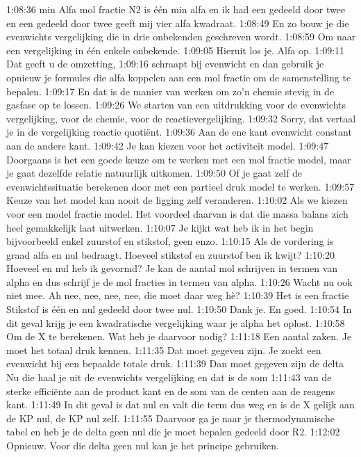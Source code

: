 1:08:36
min Alfa mol fractie N2 is één min alfa en ik had een gedeeld door twee en een gedeeld door twee geeft mij vier alfa kwadraat.
1:08:49
En zo bouw je die evenwichts vergelijking die in drie onbekenden geschreven wordt.
1:08:59
Om naar een vergelijking in één enkele onbekende.
1:09:05
Hieruit los je. Alfa op.
1:09:11
Dat geeft u de omzetting,
1:09:16
schraapt bij evenwicht en dan gebruik je opnieuw je formules die alfa koppelen aan een mol fractie om de samenstelling te bepalen.
1:09:17
En dat is de manier van werken om zo'n chemie stevig in de gasfase op te lossen.
1:09:26
We starten van een uitdrukking voor de evenwichts vergelijking, voor de chemie, voor de reactievergelijking.
1:09:32
Sorry, dat vertaal je in de vergelijking reactie quotiënt.
1:09:36
Aan de ene kant evenwicht constant aan de andere kant.
1:09:42
Je kan kiezen voor het activiteit model.
1:09:47
Doorgaans is het een goede keuze om te werken met een mol fractie model, maar je gaat dezelfde relatie natuurlijk uitkomen.
1:09:50
Of je gaat zelf de evenwichtssituatie berekenen door met een partieel druk model te werken.
1:09:57
Keuze van het model kan nooit de ligging zelf veranderen.
1:10:02
Als we kiezen voor een model fractie model. Het voordeel daarvan is dat die massa balans zich heel gemakkelijk laat uitwerken.
1:10:07
Je kijkt wat heb ik in het begin bijvoorbeeld enkel zuurstof en stikstof, geen enzo.
1:10:15
Als de vordering is graad alfa en nul bedraagt. Hoeveel stikstof en zuurstof ben ik kwijt?
1:10:20
Hoeveel en nul heb ik gevormd? Je kan de aantal mol schrijven in termen van alpha en dus schrijf je de mol fracties in termen van alpha.
1:10:26
Wacht nu ook niet mee. Ah nee, nee, nee, nee, die moet daar weg hè?
1:10:39
Het is een fractie Stikstof is één en nul gedeeld door twee nul.
1:10:50
Dank je. En goed.
1:10:54
In dit geval krijg je een kwadratische vergelijking waar je alpha het oplost.
1:10:58
Om de X te berekenen. Wat heb je daarvoor nodig?
1:11:18
Een aantal zaken. Je moet het totaal druk kennen.
1:11:35
Dat moet gegeven zijn. Je zoekt een evenwicht bij een bepaalde totale druk.
1:11:39
Dan moet gegeven zijn de delta Nu die haal je uit de evenwichts vergelijking en dat is de som
1:11:43
van de sterke efficiënte aan de product kant en de som van de centen aan de reagens kant.
1:11:49
In dit geval is dat nul en valt die term dus weg en is de X gelijk aan de KP nul, de KP nul zelf.
1:11:55
Daarvoor ga je naar je thermodynamische tabel en heb je de delta geen nul die je moet bepalen gedeeld door R2.
1:12:02
Opnieuw. Voor die delta geen nul kan je het principe gebruiken.
